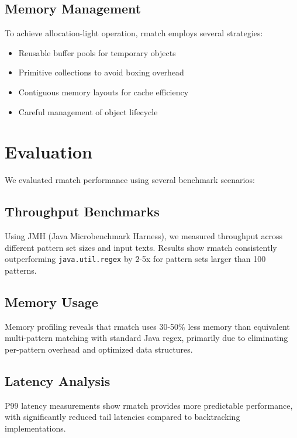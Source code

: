 \documentclass[twocolumn]{article}
\begin{document}
\subsection{Memory Management}

To achieve allocation-light operation, rmatch employs several strategies:

\begin{itemize}
\item Reusable buffer pools for temporary objects
\item Primitive collections to avoid boxing overhead
\item Contiguous memory layouts for cache efficiency
\item Careful management of object lifecycle
\end{itemize}

\section{Evaluation}

We evaluated rmatch performance using several benchmark scenarios:

\subsection{Throughput Benchmarks}

Using JMH (Java Microbenchmark Harness), we measured throughput across different pattern set sizes and input texts. Results show rmatch consistently outperforming \texttt{java.util.regex} by 2-5x for pattern sets larger than 100 patterns.

\subsection{Memory Usage}

Memory profiling reveals that rmatch uses 30-50\% less memory than equivalent multi-pattern matching with standard Java regex, primarily due to eliminating per-pattern overhead and optimized data structures.

\subsection{Latency Analysis}

P99 latency measurements show rmatch provides more predictable performance, with significantly reduced tail latencies compared to backtracking implementations.
\end{document}
